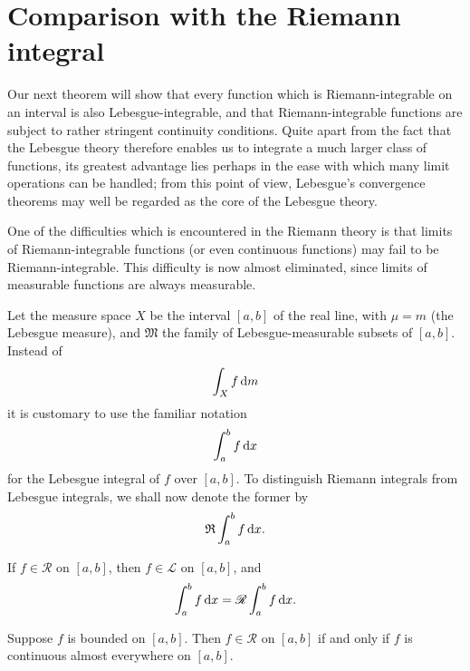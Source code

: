 
\section{Comparison with the Riemann integral}

Our next theorem will show that every function which is Riemann-integrable
on an interval is also Lebesgue-integrable, 
and that Riemann-integrable functions are subject to rather stringent continuity conditions. 
Quite apart from the fact that the Lebesgue theory therefore enables us to integrate a much larger class of functions, 
its greatest advantage lies perhaps in the ease with which many limit operations can be handled; 
from this point of view, 
Lebesgue's convergence theorems may well be regarded as the core of the Lebesgue theory.


One of the difficulties which is encountered in the Riemann theory is
that limits of Riemann-integrable functions 
(or even continuous functions)
may fail to be Riemann-integrable. 
This difficulty is now almost eliminated,
since limits of measurable functions are always measurable.

Let the measure space $X$ be the interval $[a, b]$ of the real line, with $\mu = m$
(the Lebesgue measure), and $\mathfrak{M}$ the family of Lebesgue-measurable subsets
of $[a, b]$. Instead of
\begin{equation*}
    \int_X f \d m
\end{equation*}
it is customary to use the familiar notation
\begin{equation*}
    \int_{a}^{b} f \d x
\end{equation*}
for the Lebesgue integral of $f$ over $[a, b]$. 
To distinguish Riemann integrals from Lebesgue integrals, 
we shall now denote the former by
\begin{equation*}
    \mathfrak{R} \int_{a}^{b} f \d x .
\end{equation*}

\begin{thm}
    \label{thm:11.33}
    \begin{asparaenum}[(a)]
        \item If $f \in \mathscr{R}$ on $[a,b]$, then $f \in \mathscr{L}$ on $[a,b]$, 
        and 
        \begin{equation}
            \label{eq:11.87}
            \int_{a}^{b} f \d x = 
            \mathscr{R} \int_{a}^{b} f \d x .
        \end{equation}
        \item Suppose $f$ is bounded on $[a,b]$. 
        Then $f \in \mathscr{R}$ on $[a,b]$ 
        if and only if $f$ is continuous almost everywhere on $[a,b]$.
    \end{asparaenum}
\end{thm}